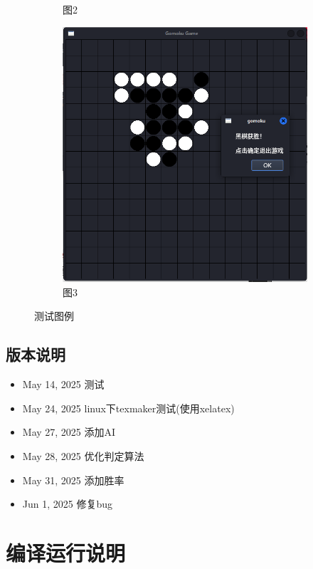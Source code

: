 \documentclass[UTF8]{ctexart}
\begin{document}
\begin{figure}[htbp]
\begin{subfigure}[b]{0.3\textwidth}
        \caption{图2}
        \label{fig:image2}
    \end{subfigure}%
    \hfill
    \begin{subfigure}[b]{0.3\textwidth}
        \centering
        \includegraphics[width=\textwidth]{screenshoot3.png}
        \caption{图3}
        \label{fig:image3}
    \end{subfigure}
    \caption{测试图例}
    \label{fig:allimages}
\end{figure}
\subsection{版本说明}
\begin{itemize}
    \item May 14, 2025 测试
    \item May 24, 2025 linux下texmaker测试(使用xelatex)
    \item May 27, 2025 添加AI
    \item May 28, 2025 优化判定算法
    \item May 31, 2025 添加胜率
    \item Jun 1, 2025 修复bug
\end{itemize}
\section{编译运行说明}
\end{document}
